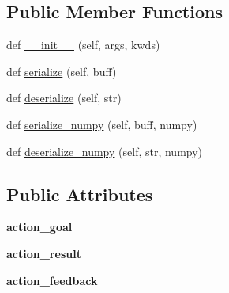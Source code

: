 \subsection*{Public Member Functions}
\begin{DoxyCompactItemize}
\item 
def \hyperlink{classlearning__actionlib_1_1msg_1_1__FibonacciAction_1_1FibonacciAction_adb8e65b771f86e63a3acc2d328e6d1a4}{\+\_\+\+\_\+init\+\_\+\+\_\+} (self, args, kwds)
\item 
def \hyperlink{classlearning__actionlib_1_1msg_1_1__FibonacciAction_1_1FibonacciAction_aa8f946332108ec5bb2716761b2c43c97}{serialize} (self, buff)
\item 
def \hyperlink{classlearning__actionlib_1_1msg_1_1__FibonacciAction_1_1FibonacciAction_a1adabc6fa0d4fd3e3402e1a461024898}{deserialize} (self, str)
\item 
def \hyperlink{classlearning__actionlib_1_1msg_1_1__FibonacciAction_1_1FibonacciAction_a77b51501cc8a0c4c695d73533da891b2}{serialize\+\_\+numpy} (self, buff, numpy)
\item 
def \hyperlink{classlearning__actionlib_1_1msg_1_1__FibonacciAction_1_1FibonacciAction_a30279e11532fded6d8218fcdb12cf92e}{deserialize\+\_\+numpy} (self, str, numpy)
\end{DoxyCompactItemize}
\subsection*{Public Attributes}
\begin{DoxyCompactItemize}
\item 
\mbox{\label{classlearning__actionlib_1_1msg_1_1__FibonacciAction_1_1FibonacciAction_ab9bce47312467c58526dfbf1cb77d98e}} 
{\bfseries action\+\_\+goal}
\item 
\mbox{\label{classlearning__actionlib_1_1msg_1_1__FibonacciAction_1_1FibonacciAction_a6b259d22d0f7f337a6c00880c0636a81}} 
{\bfseries action\+\_\+result}
\item 
\mbox{\label{classlearning__actionlib_1_1msg_1_1__FibonacciAction_1_1FibonacciAction_aeff667d9f527df1184788a534febbdd2}} 
{\bfseries action\+\_\+feedback}
\end{DoxyCompactItemize}


